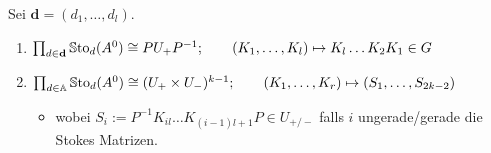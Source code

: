 \begin{lem}
  Sei $\textbf{d}=(d_1,\dots,d_l)$.
  \begin{enumerate}
    \item $\prod_{d\in\textbf{d}}\operatorname{\mathbb{S}to}_d(A^0)\cong PU_+P^{-1};
      \qquad
      (K_1,\dots,K_l)\mapsto K_l\dots K_2K_1\in G$
    \item $\prod_{d\in\mathbb{A}}\operatorname{\mathbb{S}to}_d(A^0)\cong (U_+\times U_-)^{k-1};
      \qquad
      (K_1,\dots,K_r)\mapsto (S_1,\dots,S_{2k-2})$
      \begin{itemize}
        \item wobei $S_i:=P^{-1}K_{il}\dots K_{(i-1)l+1}P\in U_{+/-}$ falls $i$
          ungerade/gerade die Stokes Matrizen.
      \end{itemize}
  \end{enumerate}
\end{lem}

